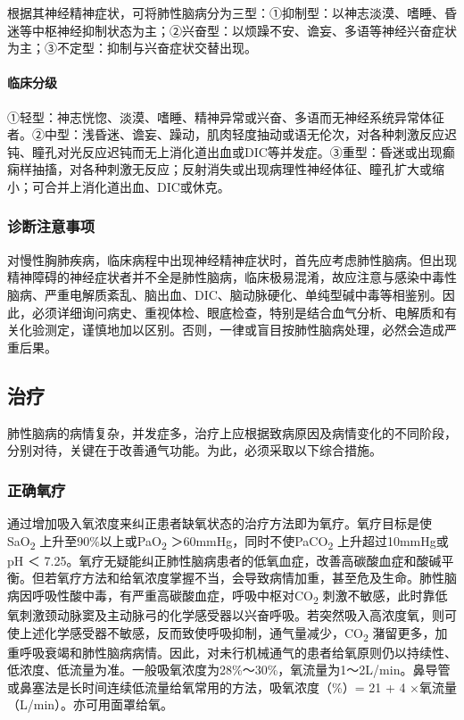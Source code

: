 根据其神经精神症状，可将肺性脑病分为三型：①抑制型：以神志淡漠、嗜睡、昏迷等中枢神经抑制状态为主；②兴奋型：以烦躁不安、谵妄、多语等神经兴奋症状为主；③不定型：抑制与兴奋症状交替出现。

\paragraph{临床分级}

①轻型：神志恍惚、淡漠、嗜睡、精神异常或兴奋、多语而无神经系统异常体征者。②中型：浅昏迷、谵妄、躁动，肌肉轻度抽动或语无伦次，对各种刺激反应迟钝、瞳孔对光反应迟钝而无上消化道出血或DIC等并发症。③重型：昏迷或出现癫痫样抽搐，对各种刺激无反应；反射消失或出现病理性神经体征、瞳孔扩大或缩小；可合并上消化道出血、DIC或休克。

\subsubsection{诊断注意事项}

对慢性胸肺疾病，临床病程中出现神经精神症状时，首先应考虑肺性脑病。但出现精神障碍的神经症状者并不全是肺性脑病，临床极易混淆，故应注意与感染中毒性脑病、严重电解质紊乱、脑出血、DIC、脑动脉硬化、单纯型碱中毒等相鉴别。因此，必须详细询问病史、重视体检、眼底检查，特别是结合血气分析、电解质和有关化验测定，谨慎地加以区别。否则，一律或盲目按肺性脑病处理，必然会造成严重后果。

\subsection{治疗}

肺性脑病的病情复杂，并发症多，治疗上应根据致病原因及病情变化的不同阶段，分别对待，关键在于改善通气功能。为此，必须采取以下综合措施。

\subsubsection{正确氧疗}

通过增加吸入氧浓度来纠正患者缺氧状态的治疗方法即为氧疗。氧疗目标是使SaO\textsubscript{2}
上升至90\%以上或PaO\textsubscript{2}
＞60mmHg，同时不使PaCO\textsubscript{2} 上升超过10mmHg或pH ＜
7.25。氧疗无疑能纠正肺性脑病患者的低氧血症，改善高碳酸血症和酸碱平衡。但若氧疗方法和给氧浓度掌握不当，会导致病情加重，甚至危及生命。肺性脑病因呼吸性酸中毒，有严重高碳酸血症，呼吸中枢对CO\textsubscript{2}
刺激不敏感，此时靠低氧刺激颈动脉窦及主动脉弓的化学感受器以兴奋呼吸。若突然吸入高浓度氧，则可使上述化学感受器不敏感，反而致使呼吸抑制，通气量减少，CO\textsubscript{2}
潴留更多，加重呼吸衰竭和肺性脑病病情。因此，对未行机械通气的患者给氧原则仍以持续性、低浓度、低流量为准。一般吸氧浓度为28\%～30\%，氧流量为1～2L/min。鼻导管或鼻塞法是长时间连续低流量给氧常用的方法，吸氧浓度（\%）=
21 + 4 ×氧流量（L/min）。亦可用面罩给氧。

